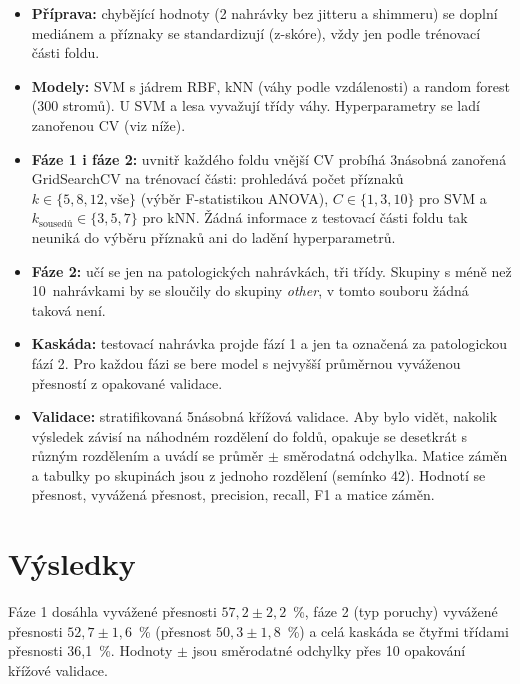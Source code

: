 \documentclass[11pt,a4paper]{article}
\begin{document}
\begin{itemize}
  \item \textbf{Příprava:} chybějící hodnoty (2 nahrávky bez jitteru a shimmeru) se doplní mediánem
        a příznaky se standardizují (z-skóre), vždy jen podle trénovací části foldu.
  \item \textbf{Modely:} SVM s jádrem RBF, kNN (váhy podle vzdálenosti) a random forest (300 stromů).
        U SVM a lesa vyvažují třídy váhy. Hyperparametry se ladí zanořenou CV (viz níže).
  \item \textbf{Fáze 1 i fáze 2:} uvnitř každého foldu vnější CV probíhá 3násobná zanořená
        GridSearchCV na trénovací části: prohledává počet příznaků $k\in\{5,8,12,\text{vše}\}$
        (výběr F-statistikou ANOVA), $C\in\{1,3,10\}$ pro SVM a $k_{\text{sousedů}}\in\{3,5,7\}$
        pro kNN. Žádná informace z testovací části foldu tak neuniká do výběru příznaků ani
        do ladění hyperparametrů.
  \item \textbf{Fáze 2:} učí se jen na patologických nahrávkách, tři třídy. Skupiny s méně než
        10~nahrávkami by se sloučily do skupiny \emph{other}, v tomto souboru žádná taková není.
  \item \textbf{Kaskáda:} testovací nahrávka projde fází 1 a jen ta označená za patologickou fází 2.
        Pro každou fázi se bere model s nejvyšší průměrnou vyváženou přesností z opakované validace.
  \item \textbf{Validace:} stratifikovaná 5násobná křížová validace. Aby bylo vidět, nakolik výsledek
        závisí na náhodném rozdělení do foldů, opakuje se desetkrát s různým rozdělením a uvádí se
        průměr $\pm$ směrodatná odchylka. Matice záměn a tabulky po skupinách jsou z jednoho rozdělení
        (semínko 42). Hodnotí se přesnost, vyvážená přesnost, precision, recall, F1 a matice záměn.
\end{itemize}

\section{Výsledky}
Fáze 1 dosáhla vyvážené přesnosti $57{,}2 \pm 2{,}2$~\%, fáze 2 (typ poruchy) vyvážené přesnosti
$52{,}7 \pm 1{,}6$~\% (přesnost $50{,}3 \pm 1{,}8$~\%) a celá kaskáda se čtyřmi třídami přesnosti 36,1~\%.
Hodnoty $\pm$ jsou směrodatné odchylky přes 10 opakování křížové validace.
\end{document}
